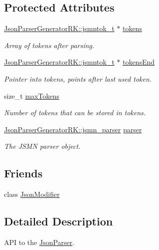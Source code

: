 \subsection*{Protected Attributes}
\begin{DoxyCompactItemize}
\item 
\hyperlink{struct_json_parser_generator_r_k_1_1jsmntok__t}{Json\+Parser\+Generator\+R\+K\+::jsmntok\+\_\+t} $\ast$ \hyperlink{class_json_parser_af2a9bba1dc92b0c38d0cab6fdad76216}{tokens}
\begin{DoxyCompactList}\small\item\em Array of tokens after parsing. \end{DoxyCompactList}\item 
\hyperlink{struct_json_parser_generator_r_k_1_1jsmntok__t}{Json\+Parser\+Generator\+R\+K\+::jsmntok\+\_\+t} $\ast$ \hyperlink{class_json_parser_a6b8c13ce885f8bc7470248d0dc56f157}{tokens\+End}
\begin{DoxyCompactList}\small\item\em Pointer into tokens, points after last used token. \end{DoxyCompactList}\item 
size\+\_\+t \hyperlink{class_json_parser_a0dfa97de05bac37c5be2e1ee9747b8a2}{max\+Tokens}
\begin{DoxyCompactList}\small\item\em Number of tokens that can be stored in tokens. \end{DoxyCompactList}\item 
\hyperlink{struct_json_parser_generator_r_k_1_1jsmn__parser}{Json\+Parser\+Generator\+R\+K\+::jsmn\+\_\+parser} \hyperlink{class_json_parser_ad8d3dc7a971bd6c8e578518ba6c874f9}{parser}
\begin{DoxyCompactList}\small\item\em The J\+S\+MN parser object. \end{DoxyCompactList}\end{DoxyCompactItemize}
\subsection*{Friends}
\begin{DoxyCompactItemize}
\item 
class \hyperlink{class_json_parser_a26df0cdb3650a4a46921ba1793ecfd03}{Json\+Modifier}
\end{DoxyCompactItemize}


\subsection{Detailed Description}
A\+PI to the \hyperlink{class_json_parser}{Json\+Parser}. 

